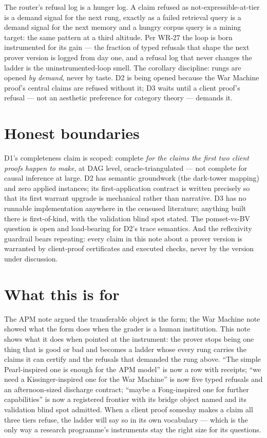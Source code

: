 \documentclass[11pt]{article}
\begin{document}
The router's refusal log is a hunger log. A claim refused as
not-expressible-at-tier is a demand signal for the next rung,
exactly as a failed retrieval query is a demand signal for the next
memory and a hungry corpus query is a mining target: the same
pattern at a third altitude. Per WR-27 the loop is born
instrumented for its gain --- the fraction of typed refusals that
shape the next prover version is logged from day one, and a refusal
log that never changes the ladder is the uninstrumented-loop smell.
The corollary discipline: rungs are opened \emph{by demand}, never
by taste. D2 is being opened because the War Machine proof's
central claims are refused without it; D3 waits until a client
proof's refusal --- not an aesthetic preference for category theory
--- demands it.

\section{Honest boundaries}

D1's completeness claim is scoped: complete \emph{for the claims
the first two client proofs happen to make}, at DAG level,
oracle-triangulated --- not complete for causal inference at large.
D2 has semantic groundwork (the dark-tower mapping) and zero
applied instances; its first-application contract is written
precisely so that its first warrant upgrade is mechanical rather
than narrative. D3 has no runnable implementation anywhere in the
censused literature; anything built there is first-of-kind, with
the validation blind spot stated. The pomset-vs-BV question is
open and load-bearing for D2's trace semantics. And the
reflexivity guardrail bears repeating: every claim in this note
about a prover version is warranted by client-proof certificates
and executed checks, never by the version under discussion.

\section{What this is for}

The APM note argued the transferable object is the form; the War
Machine note showed what the form does when the grader is a human
institution. This note shows what it does when pointed at the
instrument: the prover stops being one thing that is good or bad
and becomes a ladder whose every rung carries the claims it can
certify and the refusals that demanded the rung above. ``The simple
Pearl-inspired one is enough for the APM model'' is now a row with
receipts; ``we need a Kissinger-inspired one for the War Machine''
is now five typed refusals and an afternoon-sized discharge
contract; ``maybe a Fong-inspired one for further capabilities''
is now a registered frontier with its bridge object named and its
validation blind spot admitted. When a client proof someday makes
a claim all three tiers refuse, the ladder will say so in its own
vocabulary --- which is the only way a research programme's
instruments stay the right size for its questions.
\end{document}
